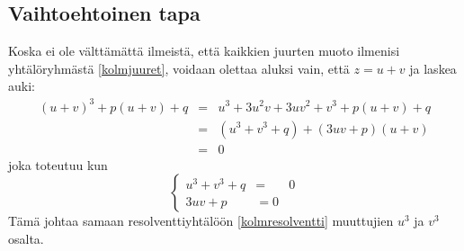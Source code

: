 \documentclass[a4paper,12pt,twoside]{article}
\begin{document}
\subsection{Vaihtoehtoinen tapa}
Koska ei ole välttämättä ilmeistä, että kaikkien juurten muoto ilmenisi yhtälöryhmästä \ref{kolmjuuret}, voidaan olettaa aluksi vain, että $z=u+v$ ja laskea auki:
\begin{eqnarray*}
  (u+v)^3+p(u+v)+q & = & u^3+3u^2 v+3uv^2+v^3+p(u+v)+q \\
  & = & (u^3+v^3+q) + (3uv+p)(u+v) \\
  & = & 0
\end{eqnarray*}
joka toteutuu kun
$$
\left\{
\begin{array}{ccc}
  u^3+v^3+q & = & 0 \\
  3uv+p & = 0
\end{array}
\right.
$$
Tämä johtaa samaan resolventtiyhtälöön \ref{kolmresolventti} muuttujien $u^3$ ja $v^3$ osalta.
\end{document}
